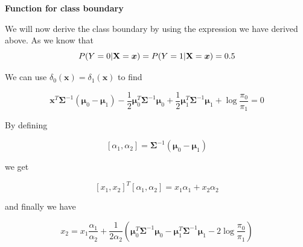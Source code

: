 \documentclass[
]{article}
\begin{document}
\textbf{Function for class boundary}

We will now derive the class boundary by using the expression we have
derived above. As we know that \[
P(Y=0 | {\bf X}={\boldsymbol x}) = P(Y=1 | {\bf X}={\boldsymbol x}) = 0.5
\]

We can use \(\delta_0({\boldsymbol x}) = \delta_1({\boldsymbol x})\) to
find

\[
{\boldsymbol x}^T\boldsymbol{\Sigma}^{-1}(\boldsymbol\mu_0 -\boldsymbol\mu_1)-\frac{1}{2}\boldsymbol\mu_0^T \boldsymbol{\Sigma}^{-1}\boldsymbol\mu_0 +\frac{1}{2}\boldsymbol\mu_1^T \boldsymbol{\Sigma}^{-1}\boldsymbol\mu_1 +\log\dfrac{ \pi_0}{ \pi_1}=0
\]

By defining

\[
[\alpha_1,\alpha_2] = \boldsymbol{\Sigma}^{-1}(\boldsymbol\mu_0 -\boldsymbol\mu_1)
\]

we get

\[
[x_1,x_2]^T[\alpha_1,\alpha_2] = x_1\alpha_1 + x_2\alpha_2
\]

and finally we have

\[
x_2 
= x_1\frac{\alpha_1}{\alpha_2} + \frac{1}{2\alpha_2}
(\boldsymbol\mu_0^T \boldsymbol{\Sigma}^{-1}\boldsymbol\mu_0 
-\boldsymbol\mu_1^T \boldsymbol{\Sigma}^{-1}\boldsymbol\mu_1 -2\log\dfrac{ \pi_0}{ \pi_1})
\]
\end{document}

